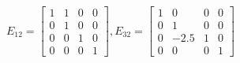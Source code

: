 \documentclass[11pt,a4paper]{article}
\begin{document}
\[E_{12} = \begin{bmatrix}
        1 & 1 & 0 & 0\\
        0 & 1 & 0 & 0\\
        0 & 0 & 1 & 0\\
        0 & 0 & 0 & 1 \end{bmatrix}, E_{32} = \begin{bmatrix}
                                                1 & 0 & 0 & 0\\
                                                0 & 1 & 0 & 0\\
                                                0 & -2.5 & 1 & 0\\
                                                0 & 0 & 0 & 1
                                                \end{bmatrix}
\]
\newpage
\end{document}
